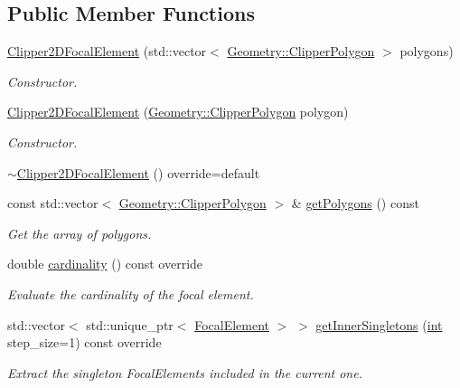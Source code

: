 \subsection*{Public Member Functions}
\begin{DoxyCompactItemize}
\item 
\hyperlink{classClipper2DFocalElement_ae8687e5aa208657a22429ac63182f183}{Clipper2\+D\+Focal\+Element} (std\+::vector$<$ \hyperlink{classGeometry_1_1ClipperPolygon}{Geometry\+::\+Clipper\+Polygon} $>$ polygons)
\begin{DoxyCompactList}\small\item\em Constructor. \end{DoxyCompactList}\item 
\hyperlink{classClipper2DFocalElement_a908a30532e268e886458fbd3793874b3}{Clipper2\+D\+Focal\+Element} (\hyperlink{classGeometry_1_1ClipperPolygon}{Geometry\+::\+Clipper\+Polygon} polygon)
\begin{DoxyCompactList}\small\item\em Constructor. \end{DoxyCompactList}\item 
\hyperlink{classClipper2DFocalElement_a69afddff55e6195330e864f33e78559a}{$\sim$\+Clipper2\+D\+Focal\+Element} () override=default
\item 
const std\+::vector$<$ \hyperlink{classGeometry_1_1ClipperPolygon}{Geometry\+::\+Clipper\+Polygon} $>$ \& \hyperlink{classClipper2DFocalElement_a933998b031a0063252d7aa63cd0cd145}{get\+Polygons} () const 
\begin{DoxyCompactList}\small\item\em Get the array of polygons. \end{DoxyCompactList}\item 
double \hyperlink{classClipper2DFocalElement_a8eabcd9808b5b6bb7ec2f26eb89b5cd9}{cardinality} () const override
\begin{DoxyCompactList}\small\item\em Evaluate the cardinality of the focal element. \end{DoxyCompactList}\item 
std\+::vector$<$ std\+::unique\+\_\+ptr$<$ \hyperlink{classFocalElement}{Focal\+Element} $>$ $>$ \hyperlink{classClipper2DFocalElement_a2455cb3cc5940ecee3e012bcdcc25f44}{get\+Inner\+Singletons} (\hyperlink{CMakeCache_8txt_a79a3d8790b2588b09777910863574e09}{int} step\+\_\+size=1) const override
\begin{DoxyCompactList}\small\item\em Extract the singleton Focal\+Elements included in the current one. \end{DoxyCompactList}\item 

\end{DoxyCompactItemize}
